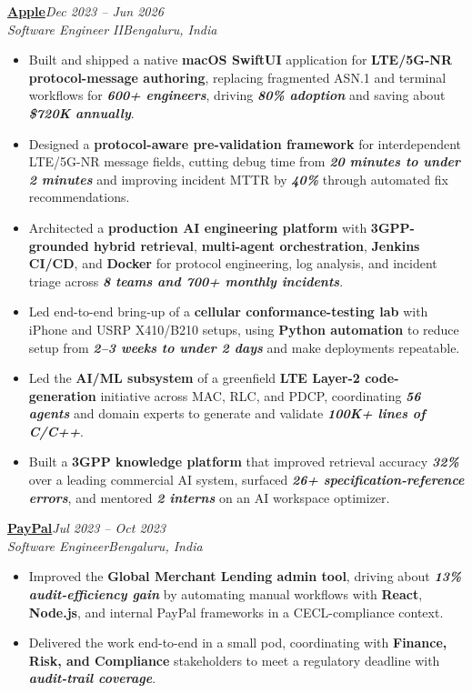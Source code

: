 \documentclass[10pt,a4paper]{article}
\newcommand{\metric}[1]{\textbf{\textit{#1}}}
\newcommand{\tech}[1]{\textbf{#1}}
\newcommand{\project}[1]{\textbf{#1}}
\newcommand{\entry}[4]{%
  \textbf{\underline{#1}}\hfill\textit{#3}\\%
  \textit{#2}\hfill \textit{#4}\vspace{-1pt}%
}
\begin{document}
\entry{Apple}{Software Engineer II}{Dec 2023 -- Jun 2026}{Bengaluru, India}
\begin{itemize}
  \item Built and shipped a native \tech{macOS SwiftUI} application for \tech{LTE/5G-NR protocol-message authoring}, replacing fragmented ASN.1 and terminal workflows for \metric{600+ engineers}, driving \metric{80\% adoption} and saving about \metric{\$720K annually}.
  \item Designed a \project{protocol-aware pre-validation framework} for interdependent LTE/5G-NR message fields, cutting debug time from \metric{20 minutes to under 2 minutes} and improving incident MTTR by \metric{40\%} through automated fix recommendations.
  \item Architected a \project{production AI engineering platform} with \tech{3GPP-grounded hybrid retrieval}, \tech{multi-agent orchestration}, \tech{Jenkins CI/CD}, and \tech{Docker} for protocol engineering, log analysis, and incident triage across \metric{8 teams and 700+ monthly incidents}.
  \item Led end-to-end bring-up of a \project{cellular conformance-testing lab} with iPhone and USRP X410/B210 setups, using \tech{Python automation} to reduce setup from \metric{2--3 weeks to under 2 days} and make deployments repeatable.
  \item Led the \tech{AI/ML subsystem} of a greenfield \tech{LTE Layer-2 code-generation} initiative across MAC, RLC, and PDCP, coordinating \metric{56 agents} and domain experts to generate and validate \metric{100K+ lines of C/C++}.
  \item Built a \project{3GPP knowledge platform} that improved retrieval accuracy \metric{32\%} over a leading commercial AI system, surfaced \metric{26+ specification-reference errors}, and mentored \metric{2 interns} on an AI workspace optimizer.
\end{itemize}

\entry{PayPal}{Software Engineer}{Jul 2023 -- Oct 2023}{Bengaluru, India}
\begin{itemize}
  \item Improved the \project{Global Merchant Lending admin tool}, driving about \metric{13\% audit-efficiency gain} by automating manual workflows with \tech{React}, \tech{Node.js}, and internal PayPal frameworks in a CECL-compliance context.
  \item Delivered the work end-to-end in a small pod, coordinating with \tech{Finance, Risk, and Compliance} stakeholders to meet a regulatory deadline with \metric{audit-trail coverage}.
\end{itemize}
\end{document}
